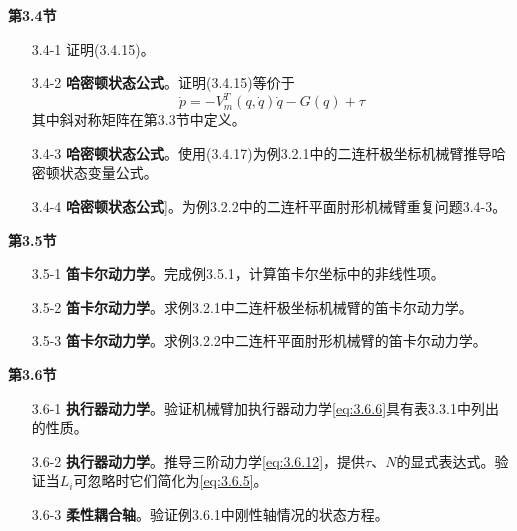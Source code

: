 \documentclass[12pt,a4paper]{ctexart}
\begin{document}
\textbf{第3.4节}

\begin{enumerate}
\item[3.4-1] 证明(3.4.15)。

\item[3.4-2] \textbf{哈密顿状态公式}。证明(3.4.15)等价于
\[ \dot{p} = -V_m^T(q,\dot{q})\dot{q} - G(q) + \tau \]
其中斜对称矩阵在第3.3节中定义。

\item[3.4-3] \textbf{哈密顿状态公式}。使用(3.4.17)为例3.2.1中的二连杆极坐标机械臂推导哈密顿状态变量公式。

\item[3.4-4] \textbf{哈密顿状态公式}]。为例3.2.2中的二连杆平面肘形机械臂重复问题3.4-3。
\end{enumerate}

\textbf{第3.5节}

\begin{enumerate}
\item[3.5-1] \textbf{笛卡尔动力学}。完成例3.5.1，计算笛卡尔坐标中的非线性项。

\item[3.5-2] \textbf{笛卡尔动力学}。求例3.2.1中二连杆极坐标机械臂的笛卡尔动力学。

\item[3.5-3] \textbf{笛卡尔动力学}。求例3.2.2中二连杆平面肘形机械臂的笛卡尔动力学。
\end{enumerate}

\textbf{第3.6节}

\begin{enumerate}
\item[3.6-1] \textbf{执行器动力学}。验证机械臂加执行器动力学\eqref{eq:3.6.6}具有表3.3.1中列出的性质。

\item[3.6-2] \textbf{执行器动力学}。推导三阶动力学\eqref{eq:3.6.12}，提供$\tau$、$N$的显式表达式。验证当$L_i$可忽略时它们简化为\eqref{eq:3.6.5}。

\item[3.6-3] \textbf{柔性耦合轴}。验证例3.6.1中刚性轴情况的状态方程。
\end{enumerate}

\ifstandalone
  
\end{document}
